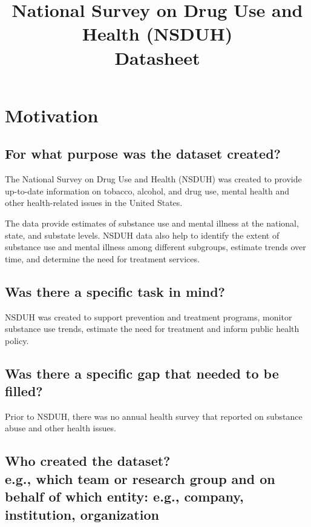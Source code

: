 \documentclass[letterpaper, 10 pt, conference]{ieeeconf}  %
\title{\LARGE \bf
National Survey on Drug Use and Health (NSDUH) \\{\color{blue}Datasheet}
}
\newcommand{\subtitle}[1]{{\\ \small \normalfont \color{purple} #1}}
\begin{document}
\maketitle
\thispagestyle{empty}
\pagestyle{empty}

\section{Motivation}

\subsection{For what purpose was the dataset created?}

The National Survey on Drug Use and Health (NSDUH) was created to provide up-to-date information on tobacco, alcohol, and drug use, mental health and other health-related issues in the United States.

The data provide estimates of substance use and mental illness at the national, state, and substate levels. NSDUH data also help to identify the extent of substance use and mental illness among different subgroups, estimate trends over time, and determine the need for treatment services.

\subsection{Was there a specific task in mind?}

NSDUH was created to support prevention and treatment programs, monitor substance use trends, estimate the need for treatment and inform public health policy.

\subsection{Was there a specific gap that needed to be filled?}

Prior to NSDUH, there was no annual health survey that reported on substance abuse and other health issues.

\subsection{Who created the dataset? \subtitle{e.g., which team or research group and on behalf of which entity: e.g., company, institution, organization}}
\end{document}

